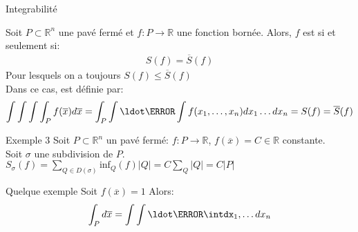 \begin{parag}{Integrabilité}
    \begin{definition}
        Soit $P \subset \mathbb{R}^{n}$ une pavé fermé et $f: P \to \mathbb{R}$ une fonction bornée. Alors,  $f$ est  si et seulement si:
        \begin{align*} S\left(f\right) =  \overline{S}\left(f\right)  \end{align*}
        Pour lesquels on a toujours $S\left(f\right) \leq \overline{S} \left(f\right)$\\
        Dans ce cas,  est définie par:
        \begin{align*} \int \int \int \int_P f\left(\overline{x}\right) d\overline{x} =  \int_P \int\ldot\s\int f\left(x_1, \ldots, x_n\right) dx_1 \ldots dx_n =  S\left(f\right) =  \overline{S}\left(f\right) \end{align*}
    \end{definition}
\end{parag}
\begin{parag}{Exemple $3$}
    Soit $P \subset \mathbb{R}^{n}$ un pavé fermé: $f: P \to \mathbb{R}$, $f\left(\overline{x}\right) =  C \in \mathbb{R}$ constante.\\
    Soit $\sigma$ une subdivision de $P$. $S_{\sigma}\left(f\right) =  \sum_{Q \in D\left(\sigma\right)} \text{inf}_Q\left(f\right)\left|Q\right| =  C \sum_{Q}\left|Q\right|= C \left|P\right| $
\end{parag}

\begin{parag}{Quelque exemple}
    Soit $f\left(\overline{x}\right) =  1$ Alors:
    \begin{align*} \int_P d\overline{x} =  \int\int\ldot\s\intdx_1, \ldots dx_n \end{align*}
\end{parag}

